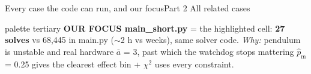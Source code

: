 \documentclass[9pt,aspectratio=169]{beamer}
\newcommand{\abar}{\ensuremath{\bar a}}
\newcommand{\phatm}{\ensuremath{\hat p_{\mathrm m}}}
\begin{document}
\begin{frame}{Every case the code can run, and our focus}{Part 2 \textperiodcentered{} All related cases}
\vspace{0.4ex}
\begin{beamercolorbox}[rounded=true, wd=\linewidth, sep=1.2mm]{palette tertiary}
\scriptsize\textbf{OUR FOCUS \textperiodcentered{} main\_short.py} = the highlighted cell: \textbf{27 solves} vs 68,445 in main.py ($\sim$2 h vs weeks), same solver code.
\textit{Why:} pendulum is unstable and real hardware \textperiodcentered{} \abar{} = 3, past which the watchdog stops mattering \textperiodcentered{} \phatm{} = 0.25 gives the clearest effect \textperiodcentered{} bin + $\chi^2$ uses every constraint.
\end{beamercolorbox}
\end{frame}

\end{document}
